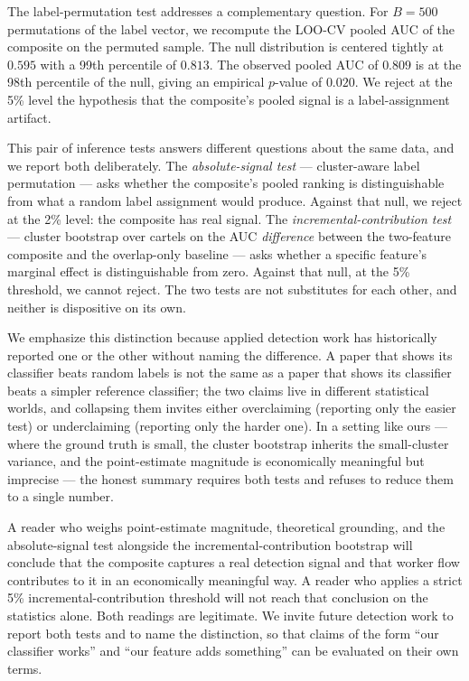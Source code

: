 The label-permutation test addresses a complementary question. For $B = 500$ permutations of the label vector, we recompute the LOO-CV pooled AUC of the composite on the permuted sample. The null distribution is centered tightly at $0.595$ with a 99th percentile of $0.813$. The observed pooled AUC of $0.809$ is at the 98th percentile of the null, giving an empirical $p$-value of $\mathbf{0.020}$. We reject at the 5\% level the hypothesis that the composite's pooled signal is a label-assignment artifact.

This pair of inference tests answers different questions about the same data, and we report both deliberately. The \emph{absolute-signal test} --- cluster-aware label permutation --- asks whether the composite's pooled ranking is distinguishable from what a random label assignment would produce. Against that null, we reject at the 2\% level: the composite has real signal. The \emph{incremental-contribution test} --- cluster bootstrap over cartels on the AUC \emph{difference} between the two-feature composite and the overlap-only baseline --- asks whether a specific feature's marginal effect is distinguishable from zero. Against that null, at the 5\% threshold, we cannot reject. The two tests are not substitutes for each other, and neither is dispositive on its own.

We emphasize this distinction because applied detection work has historically reported one or the other without naming the difference. A paper that shows its classifier beats random labels is not the same as a paper that shows its classifier beats a simpler reference classifier; the two claims live in different statistical worlds, and collapsing them invites either overclaiming (reporting only the easier test) or underclaiming (reporting only the harder one). In a setting like ours --- where the ground truth is small, the cluster bootstrap inherits the small-cluster variance, and the point-estimate magnitude is economically meaningful but imprecise --- the honest summary requires both tests and refuses to reduce them to a single number.

A reader who weighs point-estimate magnitude, theoretical grounding, and the absolute-signal test alongside the incremental-contribution bootstrap will conclude that the composite captures a real detection signal and that worker flow contributes to it in an economically meaningful way. A reader who applies a strict 5\% incremental-contribution threshold will not reach that conclusion on the statistics alone. Both readings are legitimate. We invite future detection work to report both tests and to name the distinction, so that claims of the form ``our classifier works'' and ``our feature adds something'' can be evaluated on their own terms.

